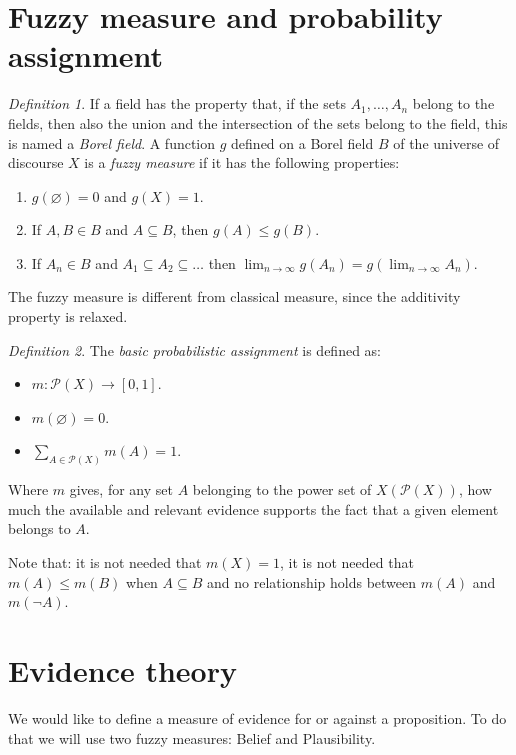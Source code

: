 \documentclass[12pt, a4paper]{report}
\theoremstyle{remark}
\newtheorem*{remark}{Definition}
\begin{document}
    \section{Fuzzy measure and probability assignment}
    \begin{remark}
        If a field has the property that, if the sets $A_1, \dots ,A_n$ belong to the fields, then also the union and the intersection of the sets
        belong to the field, this is named a \emph{Borel field}. A function $g$ defined on a Borel field $B$ of the universe of discourse $X$ is 
        a \emph{fuzzy measure} if it has the following properties: 
        \begin{enumerate}
            \item $g(\varnothing)=0$ and $g(X)=1$.
            \item If $A,B \in B$ and $A \subseteq B$, then $g(A) \leq g(B)$.
            \item If $A_n \in B$ and $A_1 \subseteq A_2 \subseteq \dots$ then $\lim_{n \to \infty}g(A_n)=g(\lim_{n \to \infty}A_n)$.
        \end{enumerate}
    \end{remark}
    The fuzzy measure is different from classical measure, since the additivity property is relaxed.
    \begin{remark}
        The \emph{basic probabilistic assignment} is defined as:
        \begin{itemize}
            \item $m:\mathcal{P}(X) \rightarrow [0,1]$.
            \item $m(\varnothing)=0$.
            \item $\sum_{A \in \mathcal{P}(X)}m(A)=1$.
        \end{itemize}
        Where $m$ gives, for any set $A$ belonging to the power set of $X(\mathcal{P}(X))$, how much the available and relevant evidence
        supports the fact that a given element belongs to $A$.
    \end{remark}
    Note that: it is not needed that $m(X)=1$, it is not needed that $m(A) \leq m(B)$ when $A\subseteq B$ and no relationship holds between 
    $m(A)$ and $m(\lnot A)$. 

    \section{Evidence theory}
    We would like to define a measure of evidence for or against a proposition. To do that we will use two fuzzy measures: Belief and Plausibility.
\end{document}

